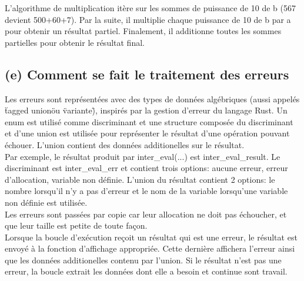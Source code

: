 \documentclass[a4paper,12pt]{article}
\begin{document}
		L'algorithme de multiplication itère sur les sommes de puissance de 10 de b (567 devient 500+60+7). Par la suite, il multiplie chaque puissance de 10 de b par a pour obtenir un résultat partiel. Finalement, il additionne toutes les sommes partielles pour obtenir le résultat final.
	\subsection{(e) Comment se fait le traitement des erreurs}
		Les erreurs sont représentées avec des types de données algébriques (aussi appelés  \"tagged union\"
		ou \"variante\"), inspirés par la gestion d'erreur du langage Rust. Un enum est utilisé comme
		discriminant et une structure composée du discriminant et d'une union est utilisée pour représenter
		le résultat d'une opération pouvant échouer. L'union contient des données additionelles sur le
		résultat.\\

		Par exemple, le résultat produit par inter\_eval(...) est inter\_eval\_result. Le discriminant
		est inter\_eval\_err et contient trois options: aucune erreur, erreur d'allocation, variable
		non définie. L'union du résultat contient 2 options: le nombre lorsqu'il n'y a pas d'erreur et
		le nom de la variable lorsqu'une variable non définie est utilisée.\\

		Les erreurs sont passées par copie car leur allocation ne doit pas échoucher, et que leur taille
		est petite de toute façon.\\

		Lorsque la boucle d'exécution reçoit un résultat qui est une erreur, le résultat est envoyé à la
		fonction d'affichage appropriée. Cette dernière affichera l'erreur ainsi que les données additionelles
		contenu par l'union. Si le résultat n'est pas une erreur, la boucle extrait les données dont elle
		a besoin et continue sont travail.
\end{document}
